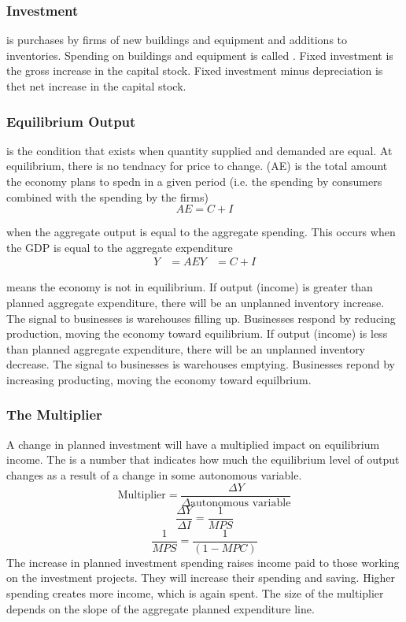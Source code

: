 \documentclass{article}
\begin{document}
\subsubsection{Investment}

 is purchases by firms of new buildings and equipment and additions to inventories. Spending on buildings and equipment is called . Fixed investment is the gross increase in the capital stock. Fixed investment minus depreciation is thet net increase in the capital stock. \\ 

\subsubsection{Equilibrium Output}

 is the condition that exists when quantity supplied and demanded are equal. At equilibrium, there is no tendnacy for price to change.  (AE) is the total amount the economy plans to spedn in a given period (i.e. the spending by consumers combined with the spending by the firms) $$AE = C+I$$ 

\begin{definition}
  when the aggregate output is equal to the aggregate spending. This occurs when the GDP is equal to the aggregate expenditure 
  \begin{align*}
    Y &= AE 
    Y &= C + I
  \end{align*}
\end{definition}

 means the economy is not in equilibrium. If output (income) is greater than planned aggregate expenditure, there will be an unplanned inventory increase. The signal to businesses is warehouses filling up. Businesses respond by reducing production, moving the economy toward equilibrium. If output (income) is less than planned aggregate expenditure, there will be an unplanned inventory decrease. The signal to businesses is warehouses emptying. Businesses repond by increasing producting, moving the economy toward equilbrium. 

\subsubsection{The Multiplier}

A change in planned investment will have a multiplied impact on equilibrium income. The  is a number that indicates how much the equilibrium level of output changes as a result of a change in some autonomous variable.
  $$\textrm{Multiplier} = \frac{\Delta Y}{\Delta \textrm{autonomous variable}}$$
  $$\frac{\Delta Y}{\Delta I} = \frac{1}{MPS}$$
  $$\frac{1}{MPS} = \frac{1}{(1 - MPC)}$$
The increase in planned investment spending raises income paid to those working on the investment projects. They will increase their spending and saving. Higher spending creates more income, which is again spent. The size of the multiplier depends on the slope of the aggregate planned expenditure line. 
\end{document}

